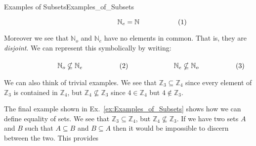 \begin{lexample}{Examples of Subsets}{Examples_of_Subsets}
\begin{subequations}
\begin{minipage}[b]{0.49\textwidth}
\begin{equation}
                            \mathbb{N}_{e}=\mathbb{N}
                        \end{equation}
                    \end{minipage}
                \end{subequations}
                \par\vspace{2.5ex}
                Moreover we see that $\mathbb{N}_{o}$ and $\mathbb{N}_{e}$
                have no elements in common. That is, they are
                \textit{disjoint}. We can represent this symbolically by
                writing:
                \par\hfill\par
                \begin{subequations}
                    \begin{minipage}[b]{0.49\textwidth}
                        \begin{equation}
                            \mathbb{N}_{o}\nsubseteq\mathbb{N}_{e}
                        \end{equation}
                    \end{minipage}
                    \hfill
                    \begin{minipage}[b]{0.49\textwidth}
                        \begin{equation}
                            \mathbb{N}_{e}\nsubseteq\mathbb{N}_{o}
                        \end{equation}
                    \end{minipage}
                \end{subequations}
                \par\vspace{2.5ex}
                We can also think of trivial examples. We see that
                $\mathbb{Z}_{3}\subseteq\mathbb{Z}_{4}$ since every element
                of $\mathbb{Z}_{3}$ is contained in $\mathbb{Z}_{4}$, but
                $\mathbb{Z}_{4}\nsubseteq\mathbb{Z}_{3}$ since
                $4\in\mathbb{Z}_{4}$ but $4\notin\mathbb{Z}_{3}$.
            \end{lexample}
            The final example shown in Ex.~\ref{ex:Examples_of_Subsets}
            shows how we can define equality of sets. We see that
            $\mathbb{Z}_{3}\subseteq\mathbb{Z}_{4}$, but
            $\mathbb{Z}_{4}\nsubseteq\mathbb{Z}_{3}$. If we have two sets
            $A$ and $B$ such that $A\subseteq{B}$ and $B\subseteq{A}$ then
            it would be impossible to discern between the two. This provides
